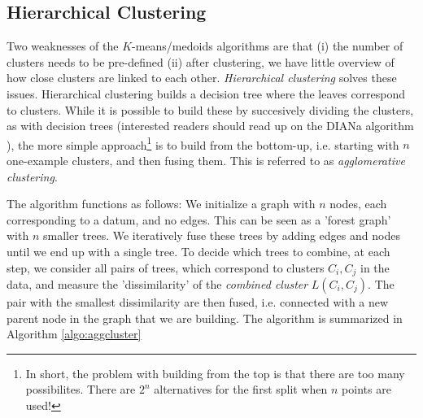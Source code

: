 \documentclass{article}
\begin{document}
\subsection{Hierarchical Clustering}
Two weaknesses of the $K$-means/medoids algorithms are that (i) the number of clusters needs to be pre-defined (ii) after clustering, we have little overview of how close clusters are linked to each other. \emph{Hierarchical clustering} solves these issues. Hierarchical clustering builds a decision tree where the leaves correspond to clusters. While it is possible to build these by succesively dividing the clusters, as with decision trees (interested readers should read up on the DIANa algorithm \cite{patnaik2016divisive}), the more simple approach\footnote{In short, the problem with building from the top is that there are too many possibilites. There are $2^n$ alternatives for the first split when $n$ points are used!} is to build from the bottom-up, i.e. starting with $n$ one-example clusters, and then fusing them. This is referred to as \emph{agglomerative clustering}.

The algorithm functions as follows: We initialize a graph with $n$ nodes, each corresponding to a datum, and no edges. This can be seen as a 'forest graph' with $n$ smaller trees. We iteratively fuse these trees by adding edges and nodes until we end up with a  single tree.  To decide which trees to combine, at each step, we consider all pairs of trees, which correspond to clusters $C_i, C_j$ in the data, and measure the 'dissimilarity' of the \emph{combined cluster} $L(C_i,C_j)$. The pair with the smallest dissimilarity are then fused, i.e. connected with a new parent node in the graph that we are building. The algorithm is summarized in Algorithm \eqref{algo:aggcluster}
\end{document}
